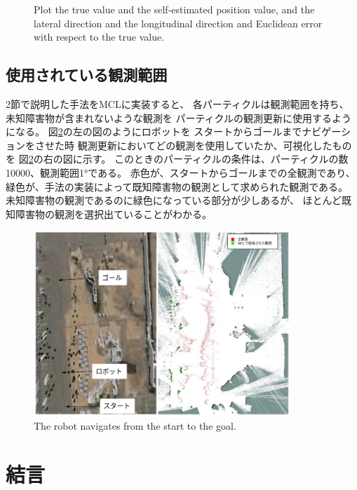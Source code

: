 \documentclass{jarticle}
\begin{document}
\begin{figure}[htbp]
\begin{center}
\begin{tabular}{cc}
  \end{tabular}
  \caption{
    Plot the true value and the self-estimated position value,
     and the lateral direction and the longitudinal 
    direction and Euclidean error with respect to the true value.}
  \label{fig: plot}
  \end{center}
\end{figure}

\subsection{使用されている観測範囲}

2節で説明した手法をMCLに実装すると、
各パーティクルは観測範囲を持ち、
未知障害物が含まれないような観測を
パーティクルの観測更新に使用するようになる。
図\ref{fig: スタートからゴールまでナビゲーション}の左の図のようにロボットを
スタートからゴールまでナビゲーションをさせた時
観測更新においてどの観測を使用していたか、可視化したものを
図\ref{fig: スタートからゴールまでナビゲーション}の右の図に示す。
このときのパーティクルの条件は、パーティクルの数10000、観測範囲1°である。
赤色が、スタートからゴールまでの全観測であり、
緑色が、手法の実装によって既知障害物の観測として求められた観測である。
未知障害物の観測であるのに緑色になっている部分が少しあるが、
ほとんど既知障害物の観測を選択出ていることがわかる。



\begin{figure}[t]
  \centering
   \includegraphics[height=70mm]{fig/particle_1000_observation_1_mcl.png}
   \vspace*{-4mm}
   \caption{The robot navigates from the start to the goal.}
   \label{fig: スタートからゴールまでナビゲーション}
\end{figure}

\section{結言}%


\footnotesize
\begin{thebibliography}{99}





\end{thebibliography}

\normalsize
\end{document}
